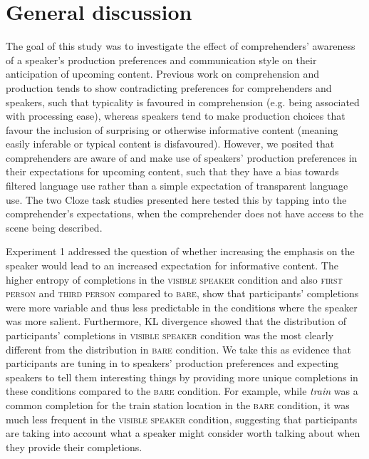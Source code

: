 \documentclass[output=paper,colorlinks,citecolor=brown]{langscibook}
\begin{document}
\section{General discussion}

The goal of this study was to investigate the effect of comprehenders’ awareness of a speaker’s production preferences and communication style on their anticipation of upcoming content. Previous work on comprehension and production tends to show contradicting preferences for comprehenders and speakers, such that typicality is favoured in comprehension (e.g. being associated with processing ease), whereas speakers tend to make production choices that favour the inclusion of surprising or otherwise informative content (meaning easily inferable or typical content is disfavoured). However, we posited that comprehenders are aware of and make use of speakers’ production preferences in their expectations for upcoming content, such that they have a bias towards filtered language use rather than a simple expectation of transparent language use. The two Cloze task studies presented here tested this by tapping into the comprehender’s expectations, when the comprehender does not have access to the scene being described.
 
Experiment 1 addressed the question of whether increasing the emphasis on the speaker would lead to an increased expectation for informative content. The higher entropy of completions in the \textsc{visible speaker} condition and also \textsc{first person} and \textsc{third person} compared to \textsc{bare}, show that participants’ completions were more variable and thus less predictable in the conditions where the speaker was more salient. Furthermore, KL divergence showed that the distribution of participants’ completions in \textsc{visible speaker} condition was the most clearly different from the distribution in \textsc{bare} condition. We take this as evidence that participants are tuning in to speakers’ production preferences and expecting speakers to tell them interesting things by providing more unique completions in these conditions compared to the \textsc{bare} condition. For example, while \textit{train} was a common completion for the train station location in the \textsc{bare} condition, it was much less frequent in the \textsc{visible speaker} condition, suggesting that participants are taking into account what a speaker might consider worth talking about when they provide their completions.
 
\end{document}
